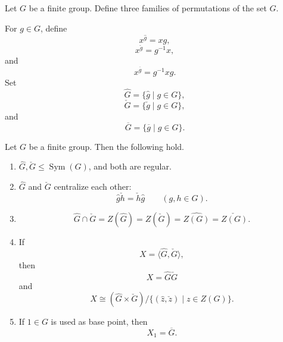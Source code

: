 Let \(G\) be a finite group. Define three families of permutations of the set \(G\).

For \(g\in G\), define
\[
    x^{\widehat g}=xg,
\]
\[
    x^{\check g}=g^{-1}x,
\]
and
\[
    x^{\overline g}=g^{-1}xg.
\]
Set
\[
    \widehat G=\{\widehat g\mid g\in G\},
\]
\[
    \check G=\{\check g\mid g\in G\},
\]
and
\[
    \overline G=\{\overline g\mid g\in G\}.
\]

\begin{lemma}
Let \(G\) be a finite group. Then the following hold.

\begin{enumerate}[label=(\arabic*)]
    \item \(\widehat G,\check G\leq \operatorname{Sym}(G)\), and both are regular.

    \item \(\widehat G\) and \(\check G\) centralize each other:
    \[
        \widehat g\check h=\check h\widehat g
        \qquad (g,h\in G).
    \]

    \item
    \[
        \widehat G\cap \check G
        =
        Z(\widehat G)
        =
        Z(\check G)
        =
        \widehat{Z(G)}
        =
        \check{Z(G)}.
    \]

    \item If
    \[
        X=\langle \widehat G,\check G\rangle,
    \]
    then
    \[
        X=\widehat G\check G
    \]
    and
    \[
        X\cong
        (\widehat G\times \check G)/
        \{(\widehat z,\check z)\mid z\in Z(G)\}.
    \]

    \item If \(1\in G\) is used as base point, then
    \[
        X_1=\overline G.
    \]
\end{enumerate}
\end{lemma}

